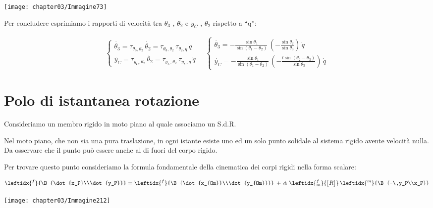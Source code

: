 \begin{enumerate}
			 \begin{center}
			 \texttt{[image: chapter03/Immagine73]}
			\end{center}
			 
			 Per concludere esprimiamo i rapporti di velocità tra $\theta_3$ , $\theta_2$ e $y_C$ , $\theta_2$ rispetto a ``q'':
			 
			 \begin{gather*}
			 \begin{cases}
			 \dot{\theta_3} = \tau_{\theta_3,\theta_2}\,\dot{\theta_2} = \tau_{\theta_3,\theta_2}\,\tau_{\theta_2 , q} \,\dot{q}\\
			 \dot{y_C} = \tau_{y_C,\theta_2}\,\dot{\theta_2} = \tau_{y_C,\theta_2}\,\tau_{y_C , q} \,\dot{q}
			 \end{cases}
			 \quad
			 \begin{cases}
			 	\dot{\theta_3} = - \frac{\sin{\theta_1}}{\sin{(\theta_1 - \theta_2)}}\,(- \frac{\sin{\theta_2}}{\sin{\theta_3}})\,\dot{q}\\
			 	\dot{y_C} = - \frac{\sin{\theta_1}}{\sin{(\theta_1 - \theta_2)}}\,(-\frac{l \sin{(\theta_2-\theta_3)}}{\sin{\theta_3}})\,\dot{q}			 
			 	\end{cases}
			  \end{gather*}
		\end{enumerate}

\section{Polo di istantanea rotazione}

\begin{minipage}{.5\textwidth}
Consideriamo un membro rigido in moto piano al quale associamo un S.d.R.

Nel moto piano, che non sia una pura traslazione, in ogni istante esiste uno ed un solo punto solidale al sistema rigido avente velocità nulla. Da osservare che il punto può essere anche al di fuori del corpo rigido.

Per trovare questo punto consideriamo la formula fondamentale della cinematica dei corpi rigidi nella forma scalare:

\[\leftidx{^f}{\B{\dot{x_P}\\\dot{y_P}}} = \leftidx{^f}{\B{\dot{x_{Om}}\\\dot{y_{Om}}}}\,+\,\dot{\alpha}\,\,\leftidx{^f_m}{\M{R}}\,\leftidx{^m}{\B{-\,y_P\\x_P}}\]
\end{minipage}
\hfill
\begin{minipage}{.5\textwidth}
\centering
\texttt{[image: chapter03/Immagine212]}
\end{minipage}
\vspace{1mm}

